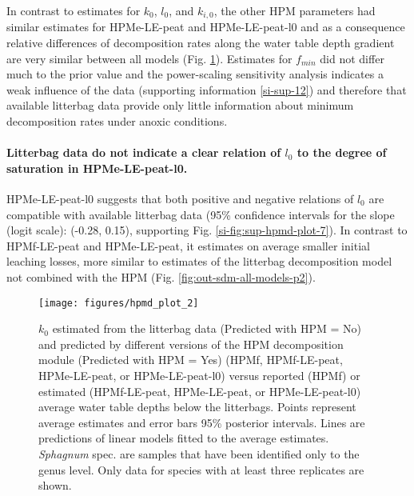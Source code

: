 \documentclass[esd, manuscript]{copernicus}
\begin{document}
In contrast to estimates for \(k_0\), \(l_0\), and \(k_{i,0}\), the other HPM parameters had similar estimates for HPMe-LE-peat and HPMe-LE-peat-l0 and as a consequence relative differences of decomposition rates along the water table depth gradient are very similar between all models (Fig. \ref{fig:out-p-hpm-mm27-2-mm29-1-mm30-1-p2}). Estimates for \(f_{min}\) did not differ much to the prior value and the power-scaling sensitivity analysis indicates a weak influence of the data (supporting information \ref{si-sup-12}) and therefore that available litterbag data provide only little information about minimum decomposition rates under anoxic conditions.

\paragraph*{\texorpdfstring{Litterbag data do not indicate a clear relation of \(l_0\) to the degree of saturation in HPMe-LE-peat-l0.}{Litterbag data do not indicate a clear relation of l\_0 to the degree of saturation in HPMe-LE-peat-l0.}}

HPMe-LE-peat-l0 suggests that both positive and negative relations of \(l_0\) are compatible with available litterbag data (95\% confidence intervals for the slope (logit scale): (-0.28, 0.15), supporting Fig. \ref{si-fig:sup-hpmd-plot-7}). In contrast to HPMf-LE-peat and HPMe-LE-peat, it estimates on average smaller initial leaching losses, more similar to estimates of the litterbag decomposition model not combined with the HPM \citep{Teickner.2024f} (Fig. \ref{fig:out-sdm-all-models-p2}).



\begin{figure}[H]

{\centering \texttt{[image: figures/hpmd\_plot\_2]} 

}

\caption{\(k_0\) estimated from the litterbag data (Predicted with HPM = No) and predicted by different versions of the HPM decomposition module (Predicted with HPM = Yes) (HPMf, HPMf-LE-peat, HPMe-LE-peat, or HPMe-LE-peat-l0) versus reported (HPMf) or estimated (HPMf-LE-peat, HPMe-LE-peat, or HPMe-LE-peat-l0) average water table depths below the litterbags. Points represent average estimates and error bars 95\% posterior intervals. Lines are predictions of linear models fitted to the average estimates. \emph{Sphagnum} spec. are samples that have been identified only to the genus level. Only data for species with at least three replicates are shown.}\label{fig:out-p-hpm-mm27-2-mm29-1-mm30-1-p2}
\end{figure}
\end{document}
